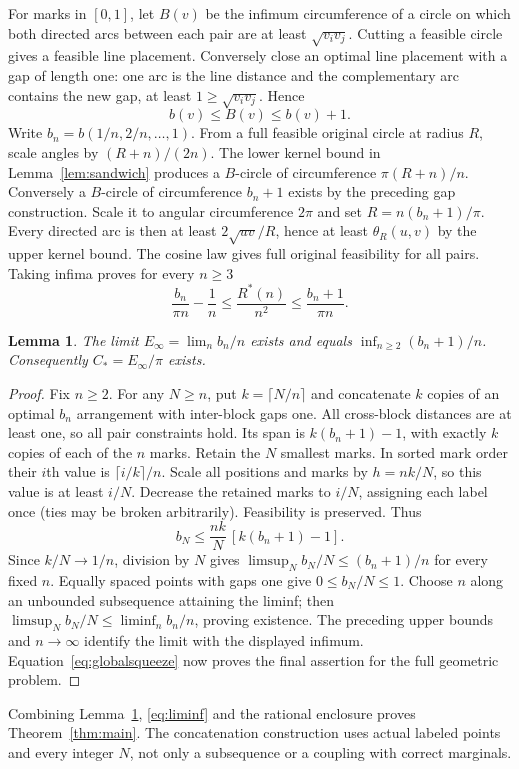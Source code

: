 \documentclass[11pt,a4paper]{article}
\newtheorem{lemma}[theorem]{Lemma}
\theoremstyle{remark}\newtheorem{remark}[theorem]{Remark}
\newcommand{\Rstar}{R^*}
\begin{document}
For marks in $[0,1]$, let $B(v)$ be the infimum circumference of a circle
on which both directed arcs between each pair are at least
$\sqrt{v_iv_j}$. Cutting a feasible circle gives a feasible line
placement. Conversely close an optimal line placement with a gap of
length one: one arc is the line distance and the complementary arc
contains the new gap, at least $1\ge\sqrt{v_iv_j}$. Hence
\begin{equation}\label{eq:bB}
b(v)\le B(v)\le b(v)+1.
\end{equation}
Write $b_n=b(1/n,2/n,\ldots,1)$. From a full feasible original circle
at radius $R$, scale angles by $(R+n)/(2n)$. The lower kernel bound
in Lemma~\ref{lem:sandwich} produces a $B$-circle of circumference
$\pi(R+n)/n$. Conversely a $B$-circle of circumference $b_n+1$ exists
by the preceding gap construction. Scale it to angular circumference
$2\pi$ and set $R=n(b_n+1)/\pi$. Every directed arc is then at least
$2\sqrt{uv}/R$, hence at least $\theta_R(u,v)$ by the upper kernel
bound. The cosine law gives full original feasibility for all pairs.
Taking infima proves for every $n\ge3$
\begin{equation}\label{eq:globalsqueeze}
\frac{b_n}{\pi n}-\frac1n\le\frac{\Rstar(n)}{n^2}
\le\frac{b_n+1}{\pi n}.
\end{equation}

\begin{lemma}\label{lem:existence}
The limit $E_\infty=\lim_n b_n/n$ exists and equals
$\inf_{n\ge2}(b_n+1)/n$. Consequently $C_*=E_\infty/\pi$ exists.
\end{lemma}
\begin{proof}
Fix $n\ge2$. For any $N\ge n$, put $k=\lceil N/n\rceil$ and
concatenate $k$ copies of an optimal $b_n$ arrangement with inter-block
gaps one. All cross-block distances are at least one, so all pair
constraints hold. Its span is $k(b_n+1)-1$, with exactly $k$ copies
of each of the $n$ marks. Retain the $N$ smallest marks. In sorted
mark order their $i$th value is $\lceil i/k\rceil/n$.
Scale all positions and marks by $h=nk/N$, so this value is at least
$i/N$. Decrease the retained marks to $i/N$, assigning each label once
(ties may be broken arbitrarily). Feasibility is preserved. Thus
\[
b_N\le\frac{nk}{N}\,[k(b_n+1)-1].
\]
Since $k/N\to1/n$, division by $N$ gives
$\limsup_N b_N/N\le(b_n+1)/n$ for every fixed $n$.
Equally spaced points with gaps one give $0\le b_N/N\le1$.
Choose $n$ along an unbounded subsequence attaining the liminf; then
$\limsup_N b_N/N\le\liminf_n b_n/n$, proving existence.
The preceding upper bounds and $n\to\infty$ identify the limit with
the displayed infimum. Equation~\eqref{eq:globalsqueeze} now proves
the final assertion for the full geometric problem.
\end{proof}
Combining Lemma~\ref{lem:existence}, \eqref{eq:liminf} and the rational
enclosure proves Theorem~\ref{thm:main}. The concatenation construction
uses actual labeled points and every integer $N$, not only a subsequence
or a coupling with correct marginals.
\end{document}

